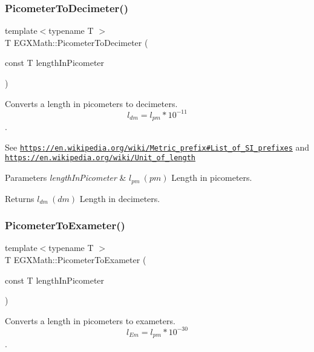 \subsubsection{\texorpdfstring{Picometer\+To\+Decimeter()}{PicometerToDecimeter()}}
{\footnotesize\ttfamily template$<$typename T $>$ \\
T E\+G\+X\+Math\+::\+Picometer\+To\+Decimeter (\begin{DoxyParamCaption}\item[{const T}]{length\+In\+Picometer }\end{DoxyParamCaption})}



Converts a length in picometers to decimeters. \[ l_{dm}=l_{pm} * 10^{-11} \]. 

See \href{https://en.wikipedia.org/wiki/Metric_prefix#List_of_SI_prefixes}{\tt https\+://en.\+wikipedia.\+org/wiki/\+Metric\+\_\+prefix\#\+List\+\_\+of\+\_\+\+S\+I\+\_\+prefixes} and \href{https://en.wikipedia.org/wiki/Unit_of_length}{\tt https\+://en.\+wikipedia.\+org/wiki/\+Unit\+\_\+of\+\_\+length} 
\begin{DoxyParams}{Parameters}
{\em length\+In\+Picometer} & $ l_{pm}\ (pm)$ Length in picometers. \\
\hline
\end{DoxyParams}
\begin{DoxyReturn}{Returns}
$ l_{dm}\ (dm)$ Length in decimeters. 
\end{DoxyReturn}
\mbox{\label{group___e_g_x_math-_conversions-_length_conversions-_picometer-_s_i_gaa62371decac9806280c05abaffc3b460}} 
\subsubsection{\texorpdfstring{Picometer\+To\+Exameter()}{PicometerToExameter()}}
{\footnotesize\ttfamily template$<$typename T $>$ \\
T E\+G\+X\+Math\+::\+Picometer\+To\+Exameter (\begin{DoxyParamCaption}\item[{const T}]{length\+In\+Picometer }\end{DoxyParamCaption})}



Converts a length in picometers to exameters. \[ l_{Em}=l_{pm} * 10^{-30} \]. 

